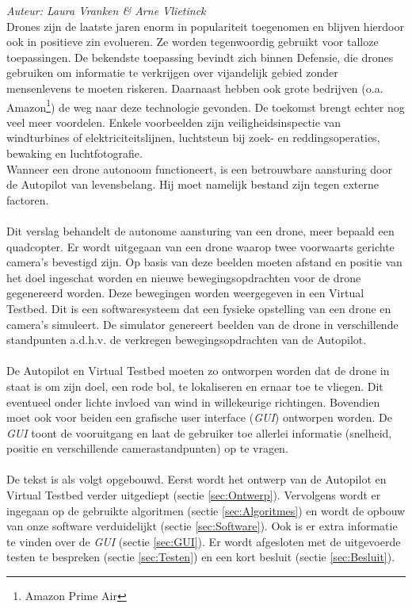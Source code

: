 {\em Auteur: Laura Vranken \& Arne Vlietinck}\\

\noindent
Drones zijn de laatste jaren enorm in populariteit toegenomen en blijven hierdoor ook in positieve zin evolueren. Ze worden tegenwoordig gebruikt voor talloze toepassingen. De bekendste toepassing bevindt zich binnen Defensie, die drones gebruiken om informatie te verkrijgen over vijandelijk gebied zonder mensenlevens te moeten riskeren. Daarnaast hebben ook grote bedrijven (o.a. Amazon\footnote{Amazon Prime Air}) de weg naar deze technologie gevonden. De toekomst brengt echter nog veel meer voordelen. Enkele voorbeelden zijn veiligheidsinspectie van windturbines of elektriciteitslijnen, luchtsteun bij zoek- en reddingsoperaties, bewaking en luchtfotografie. \cite{website:microdrones}
\\
Wanneer een drone autonoom functioneert, is een betrouwbare aansturing door de Autopilot van levensbelang. Hij moet namelijk bestand zijn tegen externe factoren.
\\
\\
Dit verslag behandelt de autonome aansturing van een drone, meer bepaald een quadcopter. Er wordt uitgegaan van een drone waarop twee voorwaarts gerichte camera's bevestigd zijn. Op basis van deze beelden moeten afstand en positie van het doel ingeschat worden en nieuwe bewegingsopdrachten voor de drone gegenereerd worden. Deze bewegingen worden weergegeven in een Virtual Testbed. Dit is een softwaresysteem dat een fysieke opstelling van een drone en camera's simuleert. \cite{arcticle:opgavePeno} De simulator genereert beelden van de drone in verschillende standpunten a.d.h.v. de verkregen bewegingsopdrachten van de Autopilot. 
\\
\\
De Autopilot en Virtual Testbed moeten zo ontworpen worden dat de drone in staat is om zijn doel, een rode bol, te lokaliseren en ernaar toe te vliegen. Dit eventueel onder lichte invloed van wind in willekeurige richtingen. Bovendien moet ook voor beiden een grafische user interface (\textit{GUI}) ontworpen worden. De \textit{GUI} toont de vooruitgang en laat de gebruiker toe allerlei informatie (snelheid, positie en verschillende camerastandpunten) op te vragen.
\\
\\
De tekst is als volgt opgebouwd. Eerst wordt het ontwerp van de Autopilot en Virtual Testbed verder uitgediept (sectie \ref{sec:Ontwerp}). Vervolgens wordt er ingegaan op de gebruikte algoritmen (sectie \ref{sec:Algoritmes}) en wordt de opbouw van onze software verduidelijkt (sectie \ref{sec:Software}). Ook is er extra informatie te vinden over de \textit{GUI} (sectie \ref{sec:GUI}). Er wordt afgesloten met de uitgevoerde testen te bespreken (sectie \ref{sec:Testen}) en een kort besluit (sectie \ref{sec:Besluit}). \\